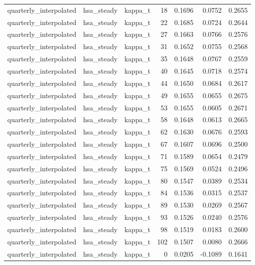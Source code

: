 \begin{tabular}{lllrrrr}
quarterly\_interpolated & hsa\_steady & kappa\_t & 18 & 0.1696 & 0.0752 & 0.2655 \\
quarterly\_interpolated & hsa\_steady & kappa\_t & 22 & 0.1685 & 0.0724 & 0.2644 \\
quarterly\_interpolated & hsa\_steady & kappa\_t & 27 & 0.1663 & 0.0766 & 0.2576 \\
quarterly\_interpolated & hsa\_steady & kappa\_t & 31 & 0.1652 & 0.0755 & 0.2568 \\
quarterly\_interpolated & hsa\_steady & kappa\_t & 35 & 0.1648 & 0.0767 & 0.2559 \\
quarterly\_interpolated & hsa\_steady & kappa\_t & 40 & 0.1645 & 0.0718 & 0.2574 \\
quarterly\_interpolated & hsa\_steady & kappa\_t & 44 & 0.1650 & 0.0684 & 0.2617 \\
quarterly\_interpolated & hsa\_steady & kappa\_t & 49 & 0.1655 & 0.0655 & 0.2675 \\
quarterly\_interpolated & hsa\_steady & kappa\_t & 53 & 0.1655 & 0.0605 & 0.2671 \\
quarterly\_interpolated & hsa\_steady & kappa\_t & 58 & 0.1648 & 0.0613 & 0.2665 \\
quarterly\_interpolated & hsa\_steady & kappa\_t & 62 & 0.1630 & 0.0676 & 0.2593 \\
quarterly\_interpolated & hsa\_steady & kappa\_t & 67 & 0.1607 & 0.0696 & 0.2500 \\
quarterly\_interpolated & hsa\_steady & kappa\_t & 71 & 0.1589 & 0.0654 & 0.2479 \\
quarterly\_interpolated & hsa\_steady & kappa\_t & 75 & 0.1569 & 0.0524 & 0.2496 \\
quarterly\_interpolated & hsa\_steady & kappa\_t & 80 & 0.1547 & 0.0389 & 0.2534 \\
quarterly\_interpolated & hsa\_steady & kappa\_t & 84 & 0.1536 & 0.0315 & 0.2537 \\
quarterly\_interpolated & hsa\_steady & kappa\_t & 89 & 0.1530 & 0.0269 & 0.2567 \\
quarterly\_interpolated & hsa\_steady & kappa\_t & 93 & 0.1526 & 0.0240 & 0.2576 \\
quarterly\_interpolated & hsa\_steady & kappa\_t & 98 & 0.1519 & 0.0183 & 0.2600 \\
quarterly\_interpolated & hsa\_steady & kappa\_t & 102 & 0.1507 & 0.0080 & 0.2666 \\
quarterly\_interpolated & hsa\_steady & kappa\_t & 0 & 0.0205 & -0.1089 & 0.1641 \\

\end{tabular}
